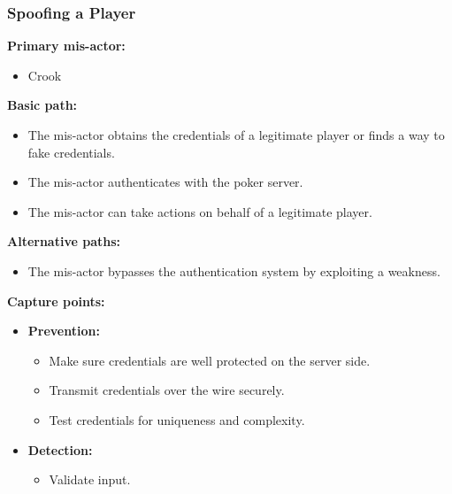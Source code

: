 \documentclass[a4paper,11pt]{report}
\begin{document}
\subsubsection{Spoofing a Player}
\textbf{Primary mis-actor:}
\begin{itemize}
\item Crook
\end{itemize}
\textbf{Basic path:}
\begin{itemize}
\item The mis-actor obtains the credentials of a legitimate player or finds a way to fake credentials.
\item The mis-actor authenticates with the poker server.
\item The mis-actor can take actions on behalf of a legitimate player.
\end{itemize}
\textbf{Alternative paths:}
\begin{itemize}
\item The mis-actor bypasses the authentication system by exploiting a weakness.
\end{itemize}
\textbf{Capture points:}
\begin{itemize}
\item \textbf{Prevention:}
\begin{itemize}
\item Make sure credentials are well protected on the server side.
\item Transmit credentials over the wire securely.
\item Test credentials for uniqueness and complexity.
\end{itemize}
\item \textbf{Detection:}
\begin{itemize}
\item Validate input.
\end{itemize}
\end{itemize}
\end{document}

